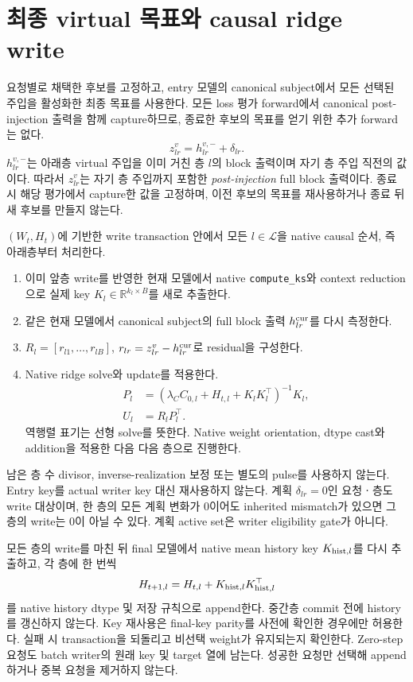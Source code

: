 \documentclass[11pt]{article}
\begin{document}
\section{최종 virtual 목표와 causal ridge write}
요청별로 채택한 후보를 고정하고, entry 모델의 canonical subject에서
모든 선택된 주입을 활성화한 최종 목표를 사용한다. 모든 loss 평가
forward에서 canonical post-injection 출력을 함께 capture하므로,
종료한 후보의 목표를 얻기 위한 추가 forward는 없다.
\begin{equation}
 z^v_{lr}=h^{v,-}_{lr}+\delta_{lr}.
 \label{eq:virtual-target}
\end{equation}
$h^{v,-}_{lr}$는 아래층 virtual 주입을 이미 거친 층 $l$의 block 출력이며
자기 층 주입 직전의 값이다. 따라서 $z^v_{lr}$는 자기 층 주입까지
포함한 \emph{post-injection} full block 출력이다.
종료 시 해당 평가에서 capture한 값을 고정하며, 이전 후보의 목표를
재사용하거나 종료 뒤 새 후보를 만들지 않는다.

$(W_t,H_t)$에 기반한 write transaction 안에서 모든
$l\in\mathcal L$을 native causal 순서, 즉 아래층부터 처리한다.
\begin{enumerate}
 \item 이미 앞층 write를 반영한 현재 모델에서 native
       \texttt{compute\_ks}와 context reduction으로 실제 key
       $K_l\in\mathbb R^{k_l\times B}$를 새로 추출한다.
 \item 같은 현재 모델에서 canonical subject의 full block 출력
       $h^{\rm cur}_{lr}$를 다시 측정한다.
 \item $R_l=[r_{l1},\ldots,r_{lB}]$,
       $r_{lr}=z^v_{lr}-h^{\rm cur}_{lr}$로 residual을 구성한다.
 \item Native ridge solve와 update를 적용한다.
       \begin{align}
       P_l&=(\lambda_C C_{0,l}+H_{t,l}+K_lK_l^\top)^{-1}K_l,\\
       U_l&=R_lP_l^\top.
       \label{eq:writer}
       \end{align}
       역행렬 표기는 선형 solve를 뜻한다. Native weight orientation,
       dtype cast와 addition을 적용한 다음 다음 층으로 진행한다.
\end{enumerate}
남은 층 수 divisor, inverse-realization 보정 또는 별도의 pulse를
사용하지 않는다. Entry key를 actual writer key 대신 재사용하지 않는다.
계획 $\delta_{lr}=0$인 요청ㆍ층도 write 대상이며, 한 층의 모든 계획
변화가 0이어도 inherited mismatch가 있으면 그 층의 write는 0이 아닐
수 있다. 계획 active set은 writer eligibility gate가 아니다.

모든 층의 write를 마친 뒤 final 모델에서 native mean history key
$K_{{\rm hist},l}$를 다시 추출하고, 각 층에 한 번씩
\begin{equation}
 H_{t+1,l}=H_{t,l}+K_{{\rm hist},l}K_{{\rm hist},l}^{\top}
 \label{eq:history}
\end{equation}
를 native history dtype 및 저장 규칙으로 append한다.
중간층 commit 전에 history를 갱신하지 않는다. Key 재사용은 final-key
parity를 사전에 확인한 경우에만 허용한다. 실패 시 transaction을
되돌리고 비선택 weight가 유지되는지 확인한다.
Zero-step 요청도 batch writer의 원래 key 및 target 열에 남는다.
성공한 요청만 선택해 append하거나 중복 요청을 제거하지 않는다.
\end{document}
